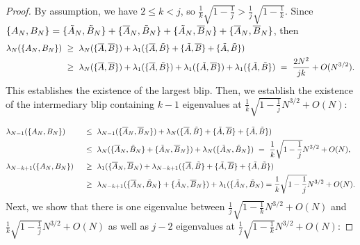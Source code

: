 \documentclass[11pt,reqno]{amsart}
\numberwithin{equation}{section}
\theoremstyle{plain}
\begin{document}
\begin{proof}
By assumption, we have $2\leq k<j$, so $\frac{1}{k}\sqrt{1-\frac{1}{j}}> \frac{1}{j}\sqrt{1-\frac{1}{k}}$. Since $\{A_N,B_N\}=\{\Tilde{A}_N,\Tilde{B}_N\}+\{\overline{A}_N,\Tilde{B}_N\}+\{\Tilde{A}_N,\overline{B}_N\}+\{\overline{A}_N,\overline{B}_N\}$, then
\begin{align}
\lambda_N(\{A_N,B_N\}) &\ \geq \ \lambda_N(\{\overline{A},\overline{B}\}) + \lambda_1(\{\overline{A},\Tilde{B}\} + \{\Tilde{A},\overline{B}\} + \{\Tilde{A},\Tilde{B}\}) \nonumber \\
&\ \geq \ \lambda_N(\{\overline{A},\overline{B}\}) + \lambda_1(\{\overline{A},\Tilde{B}\}) + \lambda_1(\{\Tilde{A},\overline{B}\}) + \lambda_1(\{\Tilde{A},\Tilde{B}\}) \ = \ \frac{2N^2}{jk} + O(N^{3/2}).
\end{align}
This establishes the existence of the largest blip. Then, we establish the existence of the intermediary blip containing $k-1$ eigenvalues at $\frac{1}{k}\sqrt{1-\frac{1}{j}}N^{3/2}+O(N)$:

\begin{alignat}{2}
&\lambda_{N-1}(\{A_N,B_N\}) &&\ \leq \ \lambda_{N-1}(\{\overline{A}_N,\overline{B}_N\})+\lambda_{N}(\{\overline{A},\Tilde{B}\} + \{\Tilde{A},\overline{B}\} + \{\Tilde{A},\Tilde{B}\}) \nonumber \\
 & &&  \ \leq \ \lambda_N(\{\overline{A}_N,\Tilde{B}_N\}+\{\Tilde{A}_N,\overline{B}_N\}) + \lambda_N(\{\Tilde{A}_N,\Tilde{B}_N\}) \ = \ \frac{1}{k}\sqrt{1-\frac{1}{j}}N^{3/2} + O(N),\nonumber
\\
&\lambda_{N-k+1}(\{A_N,B_N\}) && \ \geq \ \lambda_{1}(\{\overline{A}_N,\overline{B}_N)+\lambda_{N-k+1}(\{\overline{A},\Tilde{B}\} + \{\Tilde{A},\overline{B}\} + \{\Tilde{A},\Tilde{B}\}) \nonumber \\
 & &&\ \geq \ 
\lambda_{N-k+1}(\{\overline{A}_N,\Tilde{B}_N\}+\{\Tilde{A}_N,\overline{B}_N\})+\lambda_1(\{\Tilde{A}_N,\Tilde{B}_N)=\frac{1}{k}\sqrt{1-\frac{1}{j}}N^{3/2} + O(N).
\end{alignat}
Next, we show that there is one eigenvalue between $\frac{1}{j}\sqrt{1-\frac{1}{k}}N^{3/2}+O(N)$ and $\frac{1}{k}\sqrt{1-\frac{1}{j}}N^{3/2}+O(N)$ as well as $j-2$ eigenvalues at $\frac{1}{j}\sqrt{1-\frac{1}{k}}N^{3/2}+O(N)$:


\end{proof}
\end{document}
